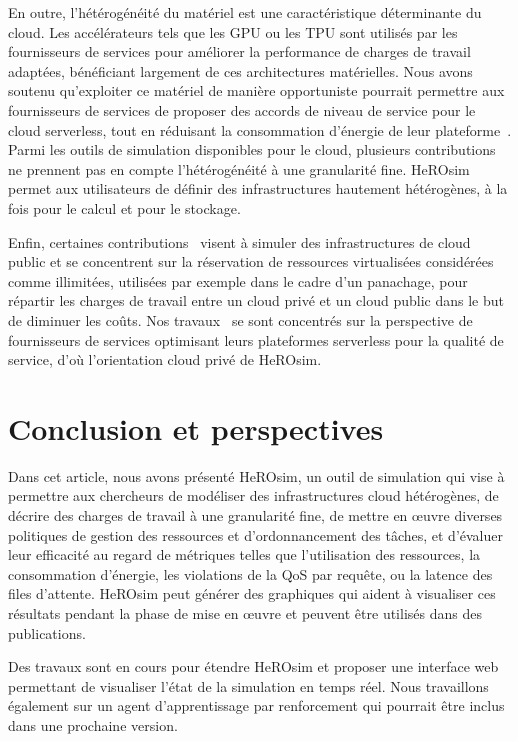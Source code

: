 En outre, l'hétérogénéité du matériel est une caractéristique déterminante du cloud. Les accélérateurs tels que les GPU ou les TPU sont utilisés par les fournisseurs de services pour améliorer la performance de charges de travail adaptées, bénéficiant largement de ces architectures matérielles. Nous avons soutenu qu'exploiter ce matériel de manière opportuniste pourrait permettre aux fournisseurs de services de proposer des accords de niveau de service pour le cloud serverless, tout en réduisant la consommation d'énergie de leur plateforme~\cite{herofake}.
Parmi les outils de simulation disponibles pour le cloud, plusieurs contributions~\cite{jeonCloudSimExtensionSimulatingDistributed2019, cai_elasticsim_2017, nunez_icancloud_2012, mahmoudiSimFaaSPerformanceSimulator2021} ne prennent pas en compte l'hétérogénéité à une granularité fine. HeROsim permet aux utilisateurs de définir des infrastructures hautement hétérogènes, à la fois pour le calcul et pour le stockage.

Enfin, certaines contributions~\cite{nunez_icancloud_2012, mahmoudiSimFaaSPerformanceSimulator2021} visent à simuler des infrastructures de cloud public et se concentrent sur la réservation de ressources virtualisées considérées comme illimitées, utilisées par exemple dans le cadre d'un panachage, pour répartir les charges de travail entre un cloud privé et un cloud public dans le but de diminuer les coûts.
Nos travaux~\cite{herofake, herocache} se sont concentrés sur la perspective de fournisseurs de services optimisant leurs plateformes serverless pour la qualité de service, d'où l'orientation cloud privé de HeROsim.

\section{Conclusion et perspectives}
\label{section:herosim-conclusion}

Dans cet article, nous avons présenté HeROsim, un outil de simulation qui vise à permettre aux chercheurs de modéliser des infrastructures cloud hétérogènes, de décrire des charges de travail à une granularité fine, de mettre en œuvre diverses politiques de gestion des ressources et d'ordonnancement des tâches, et d'évaluer leur efficacité au regard de métriques telles que l'utilisation des ressources, la consommation d'énergie, les violations de la QoS par requête, ou la latence des files d'attente. HeROsim peut générer des graphiques qui aident à visualiser ces résultats pendant la phase de mise en œuvre et peuvent être utilisés dans des publications.

Des travaux sont en cours pour étendre HeROsim et proposer une interface web permettant de visualiser l'état de la simulation en temps réel. Nous travaillons également sur un agent d'apprentissage par renforcement qui pourrait être inclus dans une prochaine version.
